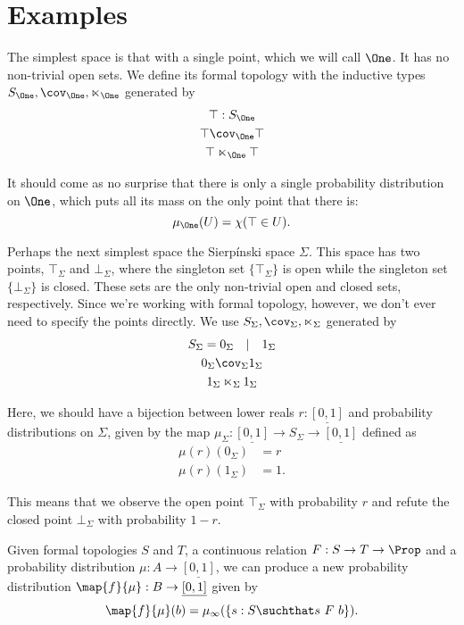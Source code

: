 \section{Examples}

The simplest space is that with a single point, which we will call $\One$. It has no non-trivial open sets. We define its formal topology with the inductive types $S_\One, \cov_\One, \ltimes_\One$ generated by
\begin{gather*}
\top : S_\One
\\ \top \cov_\One \top
\\ \top \ltimes_\One \top
\end{gather*}

It should come as no surprise that there is only a single probability distribution on $\One$, which puts all its mass on the only point that there is:
\[
\mu_\One(U) = \chi(\top \in U).
\]

Perhaps the next simplest space the Sierpínski space $\Sigma$. This space has two points, $\top_\Sigma$ and $\bot_\Sigma$, where the singleton set $\{\top_\Sigma\}$ is open while the singleton set $\{ \bot_\Sigma \}$ is closed. These sets are the only non-trivial open and closed sets, respectively. Since we're working with formal topology, however, we don't ever need to specify the points directly. We use $S_\Sigma, \cov_\Sigma, \ltimes_\Sigma$ generated by
\begin{gather*}
S_\Sigma = 0_\Sigma \quad | \quad 1_\Sigma
\\ 0_\Sigma \cov_\Sigma 1_\Sigma
\\ 1_\Sigma \ltimes_\Sigma 1_\Sigma
\end{gather*}

Here, we should have a bijection between lower reals $r : \underline{[0,1]}$ and probability distributions on $\Sigma$, given by the map $\mu_\Sigma : \underline{[0,1]} \to S_\Sigma \to \underline{[0,1]}$ defined as
\begin{align*}
    \mu(r)(0_\Sigma) &= r
\\  \mu(r)(1_\Sigma) &= 1.
\end{align*}

This means that we observe the open point $\top_\Sigma$ with probability $r$ and refute the closed point $\bot_\Sigma$ with probability $1 - r$.

Given formal topologies $S$ and $T$, a continuous relation $F : S \to T \to \Prop$ and a probability distribution $\mu : A \to \underline{[0,1]}$, we can produce a new probability distribution $\map{f}{\mu} : B \to \underline{[0,1]}$ given by
\[
\map{f}{\mu}(b) = \mu_\infty(\{ s : S \suchthat s\ F\ b \}).
\]

